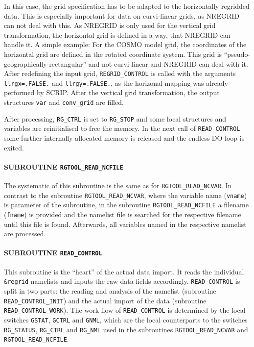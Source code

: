\documentclass[11pt,twoside]{report}
\begin{document}
\begin{itemize}
\begin{itemize}
In this case, the grid specification has to be adapted to the horizontally 
regridded data. This is especially important for data on curvi-linear grids,
as NREGRID can not deal with this. As NREGRID is only used for the vertical
grid transformation, the horizontal grid is defined in a way, that
NREGRID can handle it.
A simple example: For the COSMO model grid, the coordinates of the
horizontal grid  
are defined in the rotated coordinate system. This grid is  
``pseudo-geographically-rectangular'' and not curvi-linear and NREGRID can
deal with it.
After redefining the input grid, \verb|REGRID_CONTROL| is called with the 
arguments \verb|llrgx=.FALSE.| and \verb|llrgy=.FALSE.|, as the horizonal
mapping was already performed by SCRIP.
After the vertical grid transformation, the output structures \verb|var| and
\verb|conv_grid| are filled.
\end{itemize}
\end{itemize}
After processing, \verb|RG_CTRL| is set to \verb|RG_STOP| and some 
local structures and variables are reinitialised to free the memory.
In the next call of \verb|READ_CONTROL| some further internally
allocated memory is released and the endless DO-loop is exited. 

\paragraph{SUBROUTINE \color{blue} \tt\bf RGTOOL\_READ\_NCFILE\\ \label{RGREADNCFILE}}
The systematic of this subroutine is the same as for  
\verb|RGTOOL_READ_NCVAR|.
In contrast to the subroutine \verb|RGTOOL_READ_NCVAR|, where the variable 
name (\verb|vname|) is parameter of the subroutine, in the subroutine
 \verb|RGTOOL_READ_NCFILE| a filename (\verb|fname|) is provided and the
namelist file is searched for the respective filename until this file is found.
Afterwards, all variables named in the respective namelist are processed.

\paragraph{SUBROUTINE \color{blue} \tt\bf READ\_CONTROL\\ \label{IGREADCONTROL}}
This subroutine is the ``heart'' of the actual data import. It reads the 
individual \verb|&regrid| namelists and inputs the raw data fields
accordingly. 
\verb|READ_CONTROL| is split in two parts: the reading and analysis
of the namelist (subroutine \verb|READ_CONTROL_INIT|) and the actual import
of the data (subroutine \verb|READ_CONTROL_WORK|).
The work flow of \verb|READ_CONTROL| is determined by the local
 switches \verb|GSTAT|, \verb|GCTRL| and \verb|GNML|, which are the local
counterparts to the switches \verb|RG_STATUS|, \verb|RG_CTRL| and 
\verb|RG_NML| used in the subroutines \verb|RGTOOL_READ_NCVAR| and 
\verb|RGTOOL_READ_NCFILE|.
\end{document}
